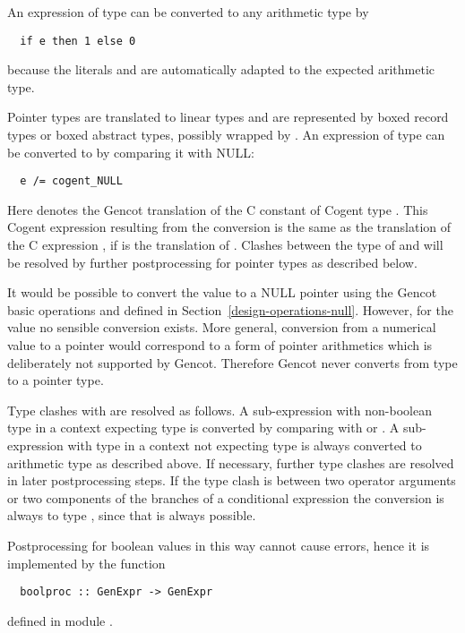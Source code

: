 An expression  of type  can be converted to any arithmetic type by
\begin{verbatim}
  if e then 1 else 0
\end{verbatim}
because the literals  and  are automatically adapted to the expected arithmetic type.

Pointer types are translated to linear types and are represented by boxed record types or boxed abstract types, possibly wrapped
by . An expression  of type  can be converted to  by comparing it with NULL:
\begin{verbatim}
  e /= cogent_NULL
\end{verbatim}
Here  denotes the Gencot translation of the C constant  of Cogent type . This
Cogent expression resulting from the conversion is the same as the translation of the C expression , if
 is the translation of . Clashes between the type of  and  will be resolved
by further postprocessing for pointer types as described below.

It would be possible to convert the value  to a NULL pointer using the Gencot basic operations  and
 defined in Section~\ref{design-operations-null}. However, for the value  no sensible conversion exists.
More general, conversion from a numerical value to a pointer would correspond to a form of pointer arithmetics which is
deliberately not supported by Gencot. Therefore Gencot never converts from type  to a pointer type.

Type clashes with  are resolved as follows. A sub-expression with non-boolean type in a context expecting type 
is converted by comparing with  or . A sub-expression with type  in a context not expecting
type  is always converted to arithmetic type  as described above. If necessary, further type clashes are resolved
in later postprocessing steps. If the type clash is between two operator arguments
or two components of the branches of a conditional expression the conversion is always to type , since that is always
possible.

Postprocessing for boolean values in this way cannot cause errors, hence it is implemented by the function
\begin{verbatim}
  boolproc :: GenExpr -> GenExpr
\end{verbatim}
defined in module .

